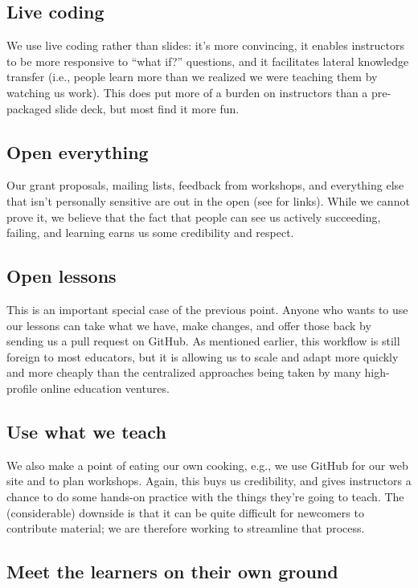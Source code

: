 \documentclass[10pt,a4paper,twocolumn]{article}
\begin{document}
\subsection*{Live coding}

We use live coding rather than slides: it's more convincing, it enables
instructors to be more responsive to ``what if?'' questions, and it
facilitates lateral knowledge transfer (i.e., people learn more than we
realized we were teaching them by watching us work). This does put more
of a burden on instructors than a pre-packaged slide deck, but most find
it more fun.

\subsection*{Open everything}

Our grant proposals, mailing lists, feedback from workshops, and
everything else that isn't personally sensitive are out in the open
(see \cite{swcsite} for links).  While we cannot prove it, we believe
that the fact that people can see us actively succeeding, failing, and
learning earns us some credibility and respect.

\subsection*{Open lessons}

This is an important special case of the previous point. Anyone who
wants to use our lessons can take what we have, make changes, and offer
those back by sending us a pull request on GitHub. As mentioned earlier,
this workflow is still foreign to most educators, but it is allowing us
to scale and adapt more quickly and more cheaply than the centralized
approaches being taken by many high-profile online education ventures.

\subsection*{Use what we teach}

We also make a point of eating our own cooking, e.g., we use GitHub for
our web site and to plan workshops. Again, this buys us credibility,
and gives instructors a chance to do some hands-on practice with the
things they're going to teach. The (considerable) downside is that it
can be quite difficult for newcomers to contribute material; we are
therefore working to streamline that process.

\subsection*{Meet the learners on their own ground}
\end{document}
